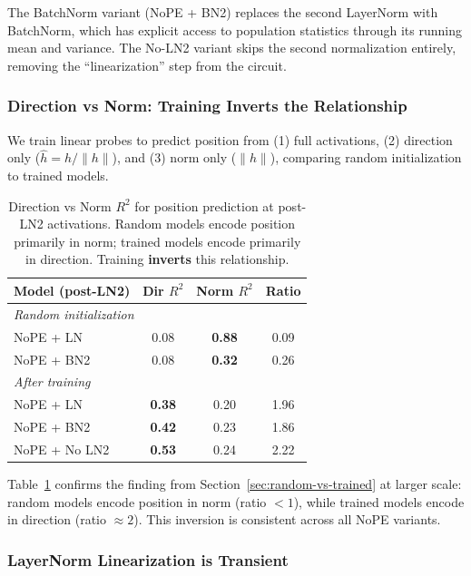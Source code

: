 \documentclass[11pt]{article}
\begin{document}
The BatchNorm variant (NoPE + BN2) replaces the second LayerNorm with BatchNorm, which has explicit access to population statistics through its running mean and variance. The No-LN2 variant skips the second normalization entirely, removing the ``linearization'' step from the circuit.

\subsubsection{Direction vs Norm: Training Inverts the Relationship}

We train linear probes to predict position from (1) full activations, (2) direction only ($\hat{h} = h/\|h\|$), and (3) norm only ($\|h\|$), comparing random initialization to trained models.

\begin{table}[htbp]
\centering
\small
\begin{tabular}{lccc}
\toprule
\textbf{Model (post-LN2)} & \textbf{Dir $R^2$} & \textbf{Norm $R^2$} & \textbf{Ratio} \\
\midrule
\multicolumn{4}{l}{\textit{Random initialization}} \\
NoPE + LN & 0.08 & \textbf{0.88} & 0.09 \\
NoPE + BN2 & 0.08 & \textbf{0.32} & 0.26 \\
\midrule
\multicolumn{4}{l}{\textit{After training}} \\
NoPE + LN & \textbf{0.38} & 0.20 & 1.96 \\
NoPE + BN2 & \textbf{0.42} & 0.23 & 1.86 \\
NoPE + No LN2 & \textbf{0.53} & 0.24 & 2.22 \\
\bottomrule
\end{tabular}
\caption{Direction vs Norm $R^2$ for position prediction at post-LN2 activations. Random models encode position primarily in norm; trained models encode primarily in direction. Training \textbf{inverts} this relationship.}
\label{tab:owt-dir-norm}
\end{table}

Table~\ref{tab:owt-dir-norm} confirms the finding from Section~\ref{sec:random-vs-trained} at larger scale: random models encode position in norm (ratio $< 1$), while trained models encode in direction (ratio $\approx 2$). This inversion is consistent across all NoPE variants.

\subsubsection{LayerNorm Linearization is Transient}
\end{document}
